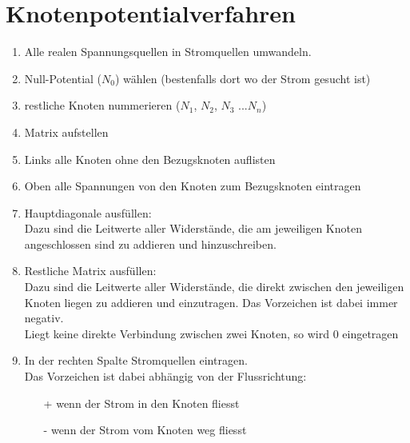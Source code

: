 



\newpage
\section{Knotenpotentialverfahren}
\begin{enumerate}
  \item Alle realen Spannungsquellen in Stromquellen umwandeln. 
  \item Null-Potential ($N_0$) wählen (bestenfalls dort wo der Strom gesucht ist)
  \item restliche Knoten nummerieren ($N_1$, $N_2$, $N_3$ ...$N_n$)
  \item Matrix aufstellen
  \item Links alle Knoten ohne den Bezugsknoten auflisten
  \item Oben alle Spannungen von den Knoten zum Bezugsknoten eintragen
  \item Hauptdiagonale ausfüllen: \\
  Dazu sind die Leitwerte aller Widerstände, die am jeweiligen Knoten angeschlossen sind zu addieren und hinzuschreiben. 
  \item Restliche Matrix ausfüllen: \\
  Dazu sind die Leitwerte aller Widerstände, die direkt zwischen den jeweiligen Knoten liegen zu addieren und einzutragen. Das Vorzeichen ist dabei immer negativ. \\
  Liegt keine direkte Verbindung zwischen zwei Knoten, so wird 0 eingetragen
  \item In der rechten Spalte Stromquellen eintragen. \\
  Das Vorzeichen ist dabei abhängig von der Flussrichtung: \\
  \begin{itemize}
    \item[+] wenn der Strom in den Knoten fliesst
    \item[-] wenn der Strom vom Knoten weg fliesst
  \end{itemize}
\end{enumerate}

